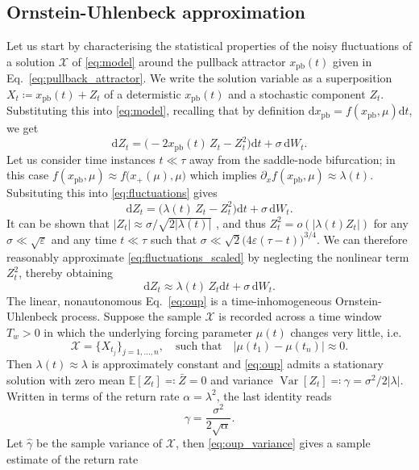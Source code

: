\documentclass[11pt,a4paper]{article}
\theoremstyle{plain}
\theoremstyle{definition}
\theoremstyle{remark}
\newcommand{\dd}{\mathrm{d}}
\newcommand{\Var}{\operatorname{Var}}
\newcommand{\E}{\mathbb{E}}
\newcommand{\xpb}{x_{\mathrm{pb}}}
\begin{document}
\subsection{Ornstein-Uhlenbeck approximation}\label{subsec:OUP}
Let us start by characterising the statistical properties of the noisy fluctuations of a solution $\mathcal{X}$ of \eqref{eq:model} around the pullback attractor $x_{\mathrm{pb}}(t)$ given in Eq.~\eqref{eq:pullback_attractor}.
We write the solution variable as a superposition $X_t\coloneqq x_{\mathrm{pb}}(t)+Z_t$ of a determistic $x_{\mathrm{pb}}(t)$ and a stochastic component $Z_t$.
Substituting this into \eqref{eq:model}, recalling that by definition $\dd\xpb=f(\xpb,\mu)\dd t$, we get
%
\begin{equation}\label{eq:fluctuations}
        \dd Z_t=\bigl(-2\xpb(t)\,Z_t-Z_t^2\bigr)\dd t+\sigma\,\dd W_t .
\end{equation}
%
Let us consider time instances $t\ll\tau$ away from the saddle-node bifurcation; in this case $f(\xpb,\mu)\approx f\bigl(x_+(\mu),\mu\bigr)$ which implies $\partial_x f(\xpb,\mu)\approx\lambda(t)$.
Subsituting this into \eqref{eq:fluctuations} gives
%
\begin{equation}\label{eq:fluctuations_scaled}
        \dd Z_t=\bigl(\lambda(t)\,Z_t-Z_t^2\bigr)\dd t+\sigma\,\dd W_t .
\end{equation}
%
It can be shown that $|Z_t|\approx\sigma/\sqrt{2|\lambda(t)|}$ \cite[Thm.~$4.1$]{Kuehn2011}, and thus $Z_t^2=o(|\lambda(t)Z_t|)$ for any $\sigma\ll\sqrt{\varepsilon}$ and any time $t\ll\tau$ such that $\sigma\ll\sqrt{2}\bigl(4\varepsilon(\tau-t)\bigr)^{3/4}$.
We can therefore reasonably approximate \eqref{eq:fluctuations_scaled} by neglecting the nonlinear term $Z_t^2$, thereby obtaining 
%
\begin{equation}\label{eq:oup}
        \dd Z_t\approx\lambda(t)\,Z_t\dd t+\sigma\,\dd W_t .
\end{equation}
%
The linear, nonautonomous Eq.~\eqref{eq:oup} is a time-inhomogeneous Ornstein-Uhlenbeck process.
Suppose the sample $\mathcal{X}$ is recorded across a time window $T_w>0$ in which the underlying forcing parameter $\mu(t)$ changes very little, i.e.
%
\begin{equation}\label{eq:sample_assumption}
        \mathcal{X}=\{X_{t_j}\}_{j=1,\dots,n} , \quad \text{such that} \quad |\mu(t_1)-\mu(t_n)|\approx0.
\end{equation}
%
Then $\lambda(t)\approx\lambda$ is approximately constant and \eqref{eq:oup} admits a stationary solution \cite[\S~$3.8$]{Gardiner2009} with zero mean $\E[Z_t]\eqqcolon\bar{Z}=0$ and variance $\Var[Z_t]\eqqcolon\gamma=\sigma^2/2|\lambda|$.
Written in terms of the return rate $\alpha=\lambda^2$, the last identity reads
%
\begin{equation}\label{eq:oup_variance}
        \gamma = \frac{\sigma^2}{2\sqrt{\alpha}} .
\end{equation}
%
Let $\hat\gamma$ be the sample variance of $\mathcal{X}$, then \eqref{eq:oup_variance} gives a sample estimate of the return rate
 
\end{document}
